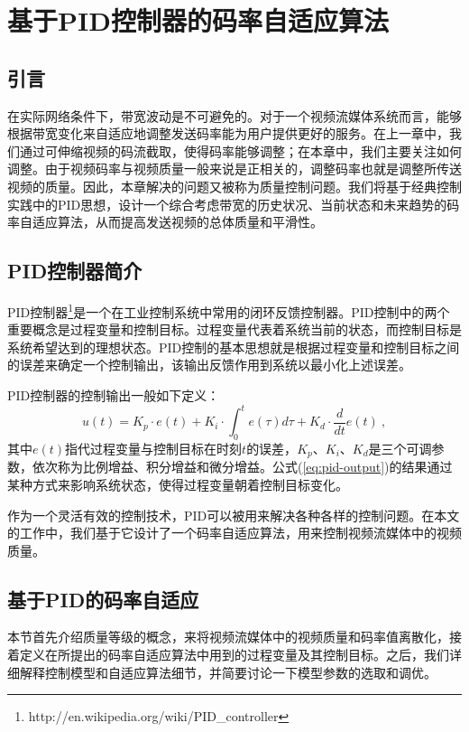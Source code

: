 \chapter{基于PID控制器的码率自适应算法}

\section{引言}

在实际网络条件下，带宽波动是不可避免的。对于一个视频流媒体系统而言，能够根据带宽变化来自适应地调整发送码率能为用户提供更好的服务。在上一章中，我们通过可伸缩视频的码流截取，使得码率能够调整；在本章中，我们主要关注如何调整。由于视频码率与视频质量一般来说是正相关的，调整码率也就是调整所传送视频的质量。因此，本章解决的问题又被称为质量控制问题。我们将基于经典控制实践中的PID思想，设计一个综合考虑带宽的历史状况、当前状态和未来趋势的码率自适应算法，从而提高发送视频的总体质量和平滑性。

\section{PID控制器简介}

PID控制器\footnote{http://en.wikipedia.org/wiki/PID\_controller}是一个在工业控制系统中常用的闭环反馈控制器。PID控制中的两个重要概念是过程变量和控制目标。过程变量代表着系统当前的状态，而控制目标是系统希望达到的理想状态。PID控制的基本思想就是根据过程变量和控制目标之间的误差来确定一个控制输出，该输出反馈作用到系统以最小化上述误差。

PID控制器的控制输出一般如下定义：
\begin{equation}
\label{eq:pid-output}
u(t) = {K_p} \cdot e(t) + {K_i} \cdot \int_0^t {e(\tau )d\tau }  + {K_d} \cdot \frac{d}{{dt}}e(t) \: ,
\end{equation}
其中$e(t)$指代过程变量与控制目标在时刻$t$的误差，$K_p$、$K_i$、$K_d$是三个可调参数，依次称为比例增益、积分增益和微分增益。公式(\ref{eq:pid-output})的结果通过某种方式来影响系统状态，使得过程变量朝着控制目标变化。

作为一个灵活有效的控制技术，PID可以被用来解决各种各样的控制问题\supercite{Wong2004}\supercite{Li1999}。在本文的工作中，我们基于它设计了一个码率自适应算法，用来控制视频流媒体中的视频质量。

\section{基于PID的码率自适应}

本节首先介绍质量等级的概念，来将视频流媒体中的视频质量和码率值离散化，接着定义在所提出的码率自适应算法中用到的过程变量及其控制目标。之后，我们详细解释控制模型和自适应算法细节，并简要讨论一下模型参数的选取和调优。

